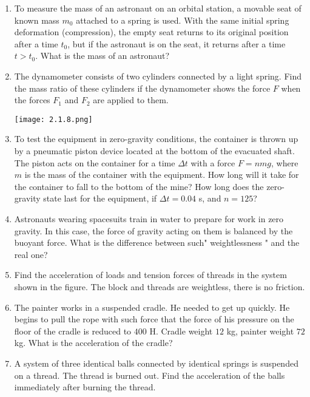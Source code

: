 \documentclass{article}
\begin{document}
\begin{enumerate}[label=2.1.\arabic*]
\item To measure the mass of an astronaut on an orbital station, a movable seat of known mass $m_0$ attached to a spring is used. With the same initial spring deformation (compression), the empty seat returns to its original position after a time $t_0$, but if the astronaut is on the seat, it returns after a time $t > t_0$. What is the mass of an astronaut?

\item The dynamometer consists of two cylinders connected by a light spring. Find the mass ratio of these cylinders if the dynamometer shows the force $F$ when the forces $F_1$ and $F_2$ are applied to them.

\begin{center}
    \texttt{[image: 2.1.8.png]}
\end{center}

\item To test the equipment in zero-gravity conditions, the container is thrown up by a pneumatic piston device located at the bottom of the evacuated shaft. The piston acts on the container for a time $\Delta t$ with a force $F = nmg$, where $m$ is the mass of the container with the equipment. How long will it take for the container to fall to the bottom of the mine? How long does the zero-gravity state last for the equipment, if $\Delta t = 0.04$ s, and $n = 125$?

\item Astronauts wearing spacesuits train in water to prepare for work in zero gravity. In this case, the force of gravity acting on them is balanced by the buoyant force. What is the difference between such" weightlessness " and the real one?

\item Find the acceleration of loads and tension forces of threads in the system shown in the figure. The block and threads are weightless, there is no friction.

\item The painter works in a suspended cradle. He needed to get up quickly. He begins to pull the rope with such force that the force of his pressure on the floor of the cradle is reduced to $400$ H. Cradle weight $12$ kg, painter weight $72$ kg. What is the acceleration of the cradle?

\item A system of three identical balls connected by identical springs is suspended on a thread. The thread is burned out. Find the acceleration of the balls immediately after burning the thread.


\end{enumerate}
\end{document}
